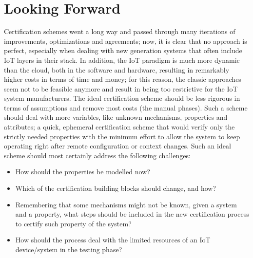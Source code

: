 \section{Looking Forward}
Certification schemes went a long way and passed through many iterations of improvements, optimizations and agreements; now, it is clear that no approach is perfect, especially when dealing with new generation systems that often include IoT layers in their stack. In addition, the IoT paradigm is much more dynamic than the cloud, both in the software and hardware, resulting in remarkably higher costs in terms of time and money; for this reason, the classic approaches seem not to be feasible anymore and result in being too restrictive for the IoT system manufacturers. The ideal certification scheme should be less rigorous in terms of assumptions and remove most costs (the manual phases). Such a scheme should deal with more variables, like unknown mechanisms, properties and attributes; a quick, ephemeral certification scheme that would verify only the strictly needed properties with the minimum effort to allow the system to keep operating right after remote configuration or context changes. Such an ideal scheme should most certainly address the following challenges:
\begin{itemize}
    \item How should the properties be modelled now?
    \item Which of the certification building blocks should change, and how?
    \item Remembering that some mechanisms might not be known, given a system and a property, what steps should be included in the new certification process to certify such property of the system?
    \item How should the process deal with the limited resources of an IoT device/system in the testing phase?

\end{itemize}
